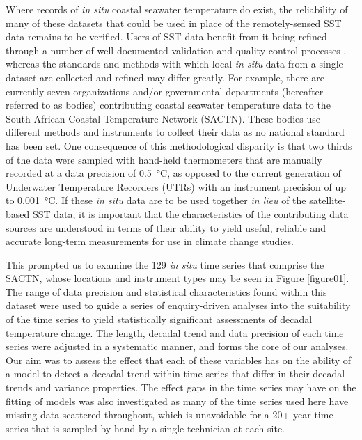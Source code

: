 \documentclass{ametsoc}
\begin{document}
Where records of \emph{in situ} coastal seawater temperature do exist, the reliability of many of these datasets that could be used in place of the remotely-sensed SST data remains to be verified. Users of SST data benefit from it being refined through a number of well documented validation and quality control processes \citep[e.g.][]{Reynolds1994, Brown1999, Martin2012}, whereas the standards and methods with which local \emph{in situ} data from a single dataset are collected and refined may differ greatly. For example, there are currently seven organizations and/or governmental departments (hereafter referred to as bodies) contributing coastal seawater temperature data to the South African Coastal Temperature Network (SACTN). These bodies use different methods and instruments to collect their data as no national standard has been set. One consequence of this methodological disparity is that two thirds of the data were sampled with hand-held thermometers that are manually recorded at a data precision of \SI{0.5}{\degreeCelsius}, as opposed to the current generation of Underwater Temperature Recorders (UTRs) with an instrument precision of up to \SI{0.001}{\degreeCelsius}. If these \emph{in situ} data are to be used together \emph{in lieu} of the satellite-based SST data, it is important that the characteristics of the contributing data sources are understood in terms of their ability to yield useful, reliable and accurate long-term measurements for use in climate change studies.

This prompted us to examine the 129 \emph{in situ} time series that comprise the SACTN, whose locations and instrument types may be seen in Figure \ref{figure01}. The range of data precision and statistical characteristics found within this dataset were used to guide a series of enquiry-driven analyses into the suitability of the time series to yield statistically significant assessments of decadal temperature change. The length, decadal trend and data precision of each time series were adjusted in a systematic manner, and forms the core of our analyses. Our aim was to assess the effect that each of these variables has on the ability of a model to detect a decadal trend within time series that differ in their decadal trends and variance properties. The effect gaps in the time series may have on the fitting of models was also investigated as many of the time series used here have missing data scattered throughout, which is unavoidable for a 20+ year time series that is sampled by hand by a single technician at each site.
\end{document}
